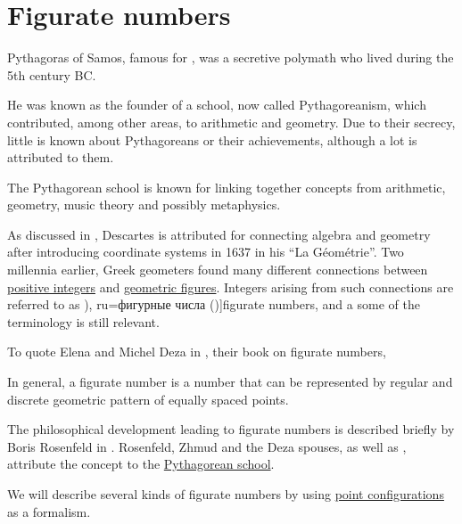 \section{Figurate numbers}\label{sec:figurate_numbers}

\begin{remark}\label{ex:pythagoreanism}
  Pythagoras of Samos, famous for , was a secretive polymath who lived during the 5th century BC.

  He was known as the founder of a school, now called Pythagoreanism, which contributed, among other areas, to arithmetic and geometry. Due to their secrecy, little is known about Pythagoreans or their achievements, although a lot is attributed to them.

  The Pythagorean school is known for linking together concepts from arithmetic, geometry, music theory and possibly metaphysics.
\end{remark}

\begin{concept}\label{con:figurate_number}
  As discussed in , Descartes is attributed for connecting algebra and geometry after introducing coordinate systems in 1637 in his \enquote{La Géométrie}. Two millennia earlier, Greek geometers found many different connections between \hyperref[def:integers]{positive integers} and \hyperref[con:geometric_shape]{geometric figures}. Integers arising from such connections are referred to as \term[en=figurate number (\cite[xv]{Deza2012FigurateNumbers}), ru=фигурные числа (\cite[14]{АлександровМаркушевичХинчин1963ЭнциклопедияТом4})]{figurate numbers}, and a some of the terminology is still relevant.

  To quote Elena and Michel Deza in \cite[xv]{Deza2012FigurateNumbers}, their book on figurate numbers,
  \begin{displayquote}
    In general, a figurate number is a number that can be represented by regular and discrete geometric pattern of equally spaced points.
  \end{displayquote}

  The philosophical development leading to figurate numbers is described briefly by Boris Rosenfeld in \cite{АлександровМаркушевичХинчин1963ЭнциклопедияТом4}. Rosenfeld, Zhmud and the Deza spouses, as well as , attribute the concept to the \hyperref[ex:pythagoreanism]{Pythagorean school}.

  We will describe several kinds of figurate numbers by using \hyperref[def:point_configuration]{point configurations} as a formalism.
\end{concept}

